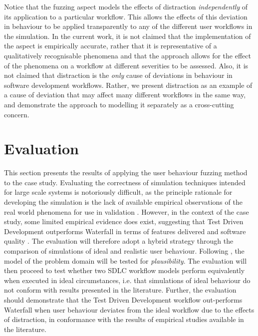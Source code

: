 \documentclass{llncs}
\begin{document}
Notice that the fuzzing aspect models the effects of distraction \emph{independently} of its application to a particular
workflow.  This allows the effects of this deviation in behaviour to be applied transparently to any of the different
user workflows in the simulation. In the current work, it is not claimed that the implementation of the aspect is
empirically accurate, rather that it is representative of a qualitatively recognisable phenomena and that the approach
allows for the effect of the phenomena on a workflow at different severities to be assessed.  Also, it is not claimed
that distraction is the \emph{only} cause of deviations in behaviour in software development workflows.  Rather, we
present distraction as an example of a cause of deviation that may affect many different workflows in the same way, and
demonstrate the approach to modelling it separately as a cross-cutting concern.
 

\section{Evaluation}
\label{sec:evaluation}


This section presents the results of applying the user behaviour fuzzing method to the case study.  Evaluating the
correctness of simulation techniques intended for large scale systems is notoriously difficult, as the principle
rationale for developing the simulation is the lack of available empirical observations of the real world phenomena for
use in validation \citet{naylor67verification}.  However, in the context of the case study, some limited empirical
evidence does exist, suggesting that Test Driven Development outperforms Waterfall in terms of features delivered and
software quality
\citep{Bhat2006TestDrivenDevelopment,George2004TestDrivenDevelopment,Huang2009EmpiricalTestFirstProgramming}.  The
evaluation will therefore adopt a hybrid strategy through the comparison of simulations of ideal and realistic user
behaviour. Following \citet{naylor67verification}, the model of the problem domain will be tested for
\emph{plausibility}.  The evaluation will then proceed to test whether two SDLC workflow models perform equivalently
when executed in ideal circumstances, i.e. that simulations of ideal behaviour do not conform with results presented in
the literature. Further, the evaluation should demonstrate that the Test Driven Development workflow out-performs
Waterfall when user behaviour deviates from the ideal workflow due to the effects of distraction, in conformance with
the results of empirical studies available in the literature.
\end{document}
